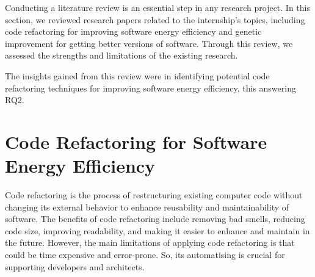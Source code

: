 Conducting a literature review is an essential step in any research project. In this section, we reviewed research papers related to the internship's topics, including code refactoring for improving software energy efficiency and genetic improvement for getting better versions of software. Through this review, we assessed the strengths and limitations of the existing research. 

\vspace{.5em}
The insights gained from this review were in identifying potential code refactoring techniques for improving software energy efficiency, this answering RQ2.

\section{Code Refactoring for Software Energy Efficiency}


Code refactoring is the process of restructuring existing computer code without changing its external behavior to enhance reusability and maintainability of software.
The benefits of code refactoring include removing bad smells, reducing code size, improving readability, and making it easier to enhance and maintain in the future. However,
the main limitations of applying code refactoring is that could be time expensive and error-prone. So, its automatising is crucial for supporting developers and architects. 

